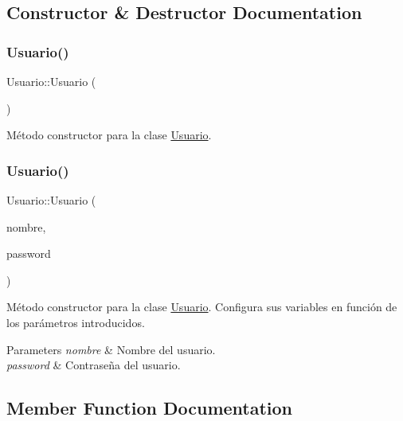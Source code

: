 \subsection{Constructor \& Destructor Documentation}
\mbox{\label{classUsuario_aa85a5371a098dfba5449140d9b8a472f}} 
\subsubsection{\texorpdfstring{Usuario()}{Usuario()}\hspace{0.1cm}{\footnotesize\ttfamily [1/2]}}
{\footnotesize\ttfamily Usuario\+::\+Usuario (\begin{DoxyParamCaption}{ }\end{DoxyParamCaption})}

Método constructor para la clase \mbox{\hyperlink{classUsuario}{Usuario}}. \mbox{\label{classUsuario_a21975acad49ffd19aa3cf818d03527ad}} 
\subsubsection{\texorpdfstring{Usuario()}{Usuario()}\hspace{0.1cm}{\footnotesize\ttfamily [2/2]}}
{\footnotesize\ttfamily Usuario\+::\+Usuario (\begin{DoxyParamCaption}\item[{Q\+String}]{nombre,  }\item[{Q\+String}]{password }\end{DoxyParamCaption})}

Método constructor para la clase \mbox{\hyperlink{classUsuario}{Usuario}}. Configura sus variables en función de los parámetros introducidos. 
\begin{DoxyParams}{Parameters}
{\em nombre} & Nombre del usuario. \\
\hline
{\em password} & Contraseña del usuario. \\
\hline
\end{DoxyParams}


\subsection{Member Function Documentation}
\mbox{\label{classUsuario_a22724fa57c4b6eca3330b8bc384700b5}} 
